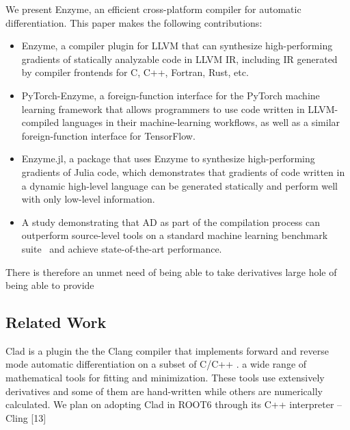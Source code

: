 
We present Enzyme, an efficient cross-platform compiler for automatic differentiation.  This paper makes the following contributions:
\begin{itemize}

\item Enzyme, a compiler plugin for LLVM that can synthesize high-performing gradients of statically analyzable code in LLVM IR, including IR generated by compiler frontends for C, C++, Fortran, Rust, etc.

\item PyTorch-Enzyme, a foreign-function interface for the PyTorch machine learning framework that allows programmers to use code written in LLVM-compiled languages in their machine-learning workflows, as well as a similar foreign-function interface for TensorFlow.

\item Enzyme.jl, a package that uses Enzyme to synthesize high-performing gradients of Julia code, which demonstrates that gradients of code written in a dynamic high-level language can be generated statically and perform well with only low-level information.

\item A study demonstrating that AD as part of the compilation process can outperform source-level tools on a standard machine learning benchmark suite~\cite{adBench} and achieve state-of-the-art performance.
\end{itemize}

There is therefore an unmet need of being able to take derivatives large hole of being able to provide 



\subsection{Related Work}

Clad is a plugin the the Clang compiler that implements forward and reverse mode automatic differentiation on a subset of C/C++ \cite{Vassilev_Clad}.
a wide range of mathematical tools for fitting and minimization. These tools use extensively
derivatives and some of them are hand-written while others are numerically calculated. We plan
on adopting Clad in ROOT6 through its C++ interpreter – Cling [13]

